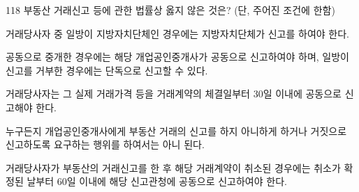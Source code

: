 \begin{question}{118}
부동산 거래신고 등에 관한 법률상 옳지 않은 것은? (단, 주어진 조건에 한함)
\begin{choices}
  \item 거래당사자 중 일방이 지방자치단체인 경우에는 지방자치단체가 신고를 하여야 한다.
  \item 공동으로 중개한 경우에는 해당 개업공인중개사가 공동으로 신고하여야 하며, 일방이 신고를 거부한 경우에는 단독으로 신고할 수 있다.
  \item 거래당사자는 그 실제 거래가격 등을 거래계약의 체결일부터 30일 이내에 공동으로 신고해야 한다.
  \item 누구든지 개업공인중개사에게 부동산 거래의 신고를 하지 아니하게 하거나 거짓으로 신고하도록 요구하는 행위를 하여서는 아니 된다.
  \item 거래당사자가 부동산의 거래신고를 한 후 해당 거래계약이 취소된 경우에는 취소가 확정된 날부터 60일 이내에 해당 신고관청에 공동으로 신고하여야 한다.
\end{choices}
\end{question}
